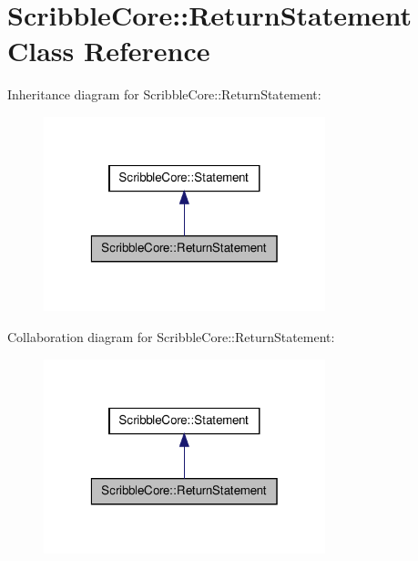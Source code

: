\hypertarget{class_scribble_core_1_1_return_statement}{\section{Scribble\-Core\-:\-:Return\-Statement Class Reference}
\label{class_scribble_core_1_1_return_statement}
}


Inheritance diagram for Scribble\-Core\-:\-:Return\-Statement\-:\nopagebreak
\begin{figure}[H]
\begin{center}
\leavevmode
\includegraphics[width=232pt]{class_scribble_core_1_1_return_statement__inherit__graph}
\end{center}
\end{figure}


Collaboration diagram for Scribble\-Core\-:\-:Return\-Statement\-:\nopagebreak
\begin{figure}[H]
\begin{center}
\leavevmode
\includegraphics[width=232pt]{class_scribble_core_1_1_return_statement__coll__graph}
\end{center}
\end{figure}
